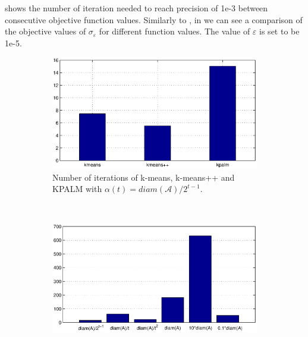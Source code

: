 
 shows the number of iteration needed to reach precision of 1e-3 between consecutive objective function values.
Similarly to , in  we can see a comparison of the objective values of $\sigma_{\varepsilon}$ for different function values. The value of $\varepsilon$ is set to be 1e-5.

\begin{figure}
    \centering
    \begin{subfigure}[b]{0.7\textwidth}
        \includegraphics[width=\textwidth]{iterations_algs_comparison}
        \caption{Number of iterations of k-means, k-means++ and KPALM with $\alpha(t)=diam(\mathcal{A})/2^{t-1}$.}
        \label{fig:iters_algs_comp}
    \end{subfigure}
    ~ %
    \begin{subfigure}[b]{0.7\textwidth}
        \includegraphics[width=\textwidth]{iterations_dynamic_alpha_kpalm_comparison}

\end{subfigure}
\end{figure}
